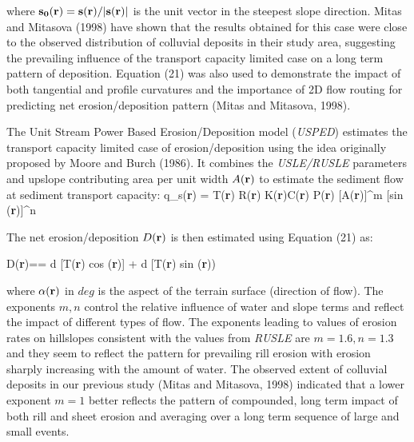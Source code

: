 \documentclass{kapedbk} %
\begin{document}
\noindent where
${\bf s_0}({\bf r})={\bf s}({\bf r})/|{\bf s}({\bf r})|$ is the
unit vector in the steepest slope direction.
Mitas and Mitasova (1998) have shown that the results obtained for
this case were close to the observed distribution of colluvial deposits
in their study area, suggesting the prevailing influence
of the transport capacity limited case on a long term
pattern of deposition. Equation (21) was also used to demonstrate
the impact of both tangential and profile curvatures 
and the importance of 2D flow routing
for predicting net erosion/deposition pattern (Mitas and Mitasova, 1998).  

The Unit Stream Power Based Erosion/Deposition model ({\sl USPED})
estimates the transport capacity limited case of erosion/deposition
using the idea originally proposed by Moore and Burch (1986).
It combines the {\sl USLE/RUSLE} parameters and 
 upslope contributing area per unit width $A({\bf r})$
to estimate the sediment flow at sediment transport capacity: 
\leftequation
q_s({\bf r}) = T({\bf r}) \approx R({\bf r}) K({\bf r})C({\bf r}) P({\bf r})
[A({\bf r})]^m [sin \beta({\bf r})]^n
\endleftequation

\noindent
The net erosion/deposition $D({\bf r})$ is then estimated using Equation (21) as:

\leftequation
D({\bf r})=\nabla\cdot \bigl[T({\bf r}){\bf s_0}({\bf r})\bigr]
= {d [T({\bf r}) cos \alpha({\bf r})] } +
{d [T({\bf r}) sin \alpha({\bf r})) }
\endleftequation

\noindent
where $\alpha({\bf r})$ in $deg$
is the aspect of the terrain surface (direction of flow).
The exponents $m,n$
control the relative influence of water and slope terms and reflect
the impact of different types of flow.
The exponents leading to values of erosion rates on hillslopes
consistent with the values from {\sl RUSLE} are $m=1.6, n=1.3$
and they seem to reflect the pattern for prevailing rill erosion
with erosion sharply increasing with the amount of water. The observed
extent of colluvial deposits in our previous study (Mitas and Mitasova, 1998)
 indicated that a lower exponent $m=1$ better reflects the pattern of compounded,
long term impact of both rill and sheet erosion and averaging over a long
term sequence of large and small events.
\end{document}
